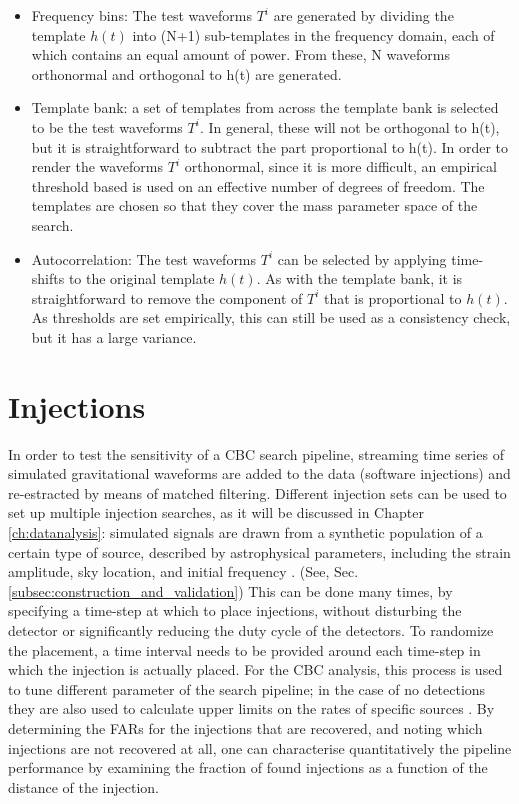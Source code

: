 \documentclass[binding=0.6cm, LaM]{sapthesis}
\begin{document}
        \begin{itemize}
        \item Frequency bins: The test waveforms $T^i$ are generated by dividing the template $h(t)$ into (N+1) 
          sub-templates in the frequency domain, each of which contains an equal amount of power. 
          From these, N waveforms orthonormal and orthogonal to h(t) are generated. 
        \item Template bank: a set of templates from across the template bank is selected to be the test waveforms $T^i$.
          In general, these will not be orthogonal to h(t), but it is straightforward to subtract the part proportional to h(t). 	
          In order to render the waveforms $T^i$ orthonormal, since it is more difficult, 
          an empirical threshold based is used on an effective number of degrees of freedom. 
          The templates are chosen so that they cover the mass parameter space of the search. 
        \item Autocorrelation: The test waveforms $T^i$ can be selected by applying time-shifts to the original template  $h(t)$. 
          As with the template bank, it is straightforward to remove the component of $T^i$ that is proportional to $h(t)$. 
          As thresholds are set empirically, this can still be used as a consistency check, but it has a large variance. 
        \end{itemize}


\section{Injections}
        In order to test the sensitivity of a CBC search pipeline,
        streaming time series of simulated gravitational waveforms are added to the data (software injections)
        and re-estracted by means of matched filtering.
        Different injection sets can be used to set up multiple injection searches, as it will be discussed in Chapter \ref{ch:datanalysis}:
        simulated signals are drawn from a synthetic population of a certain type of source,
        described by astrophysical parameters, including the strain amplitude, sky location,
        and initial frequency \cite{30}. (See, Sec.\ref{subsec:construction_and_validation})
        This can be done many times, by specifying a time-step at which to place injections,
        without disturbing the detector or significantly reducing the duty cycle of the detectors.
        To randomize the placement, a time interval needs to be provided around
        each time-step in which the injection is actually placed.
        For the CBC analysis, this process is used to tune different parameter of the search pipeline;
        in the case of no detections they are also used to calculate upper limits on the rates of specific sources \cite{47}.
        By determining the FARs for the injections that are recovered,
        and noting which injections are not recovered at all,
        one can characterise quantitatively the pipeline performance \cite{47, 48}
        by examining the fraction of found injections as a function of the distance of the injection.
\end{document}
